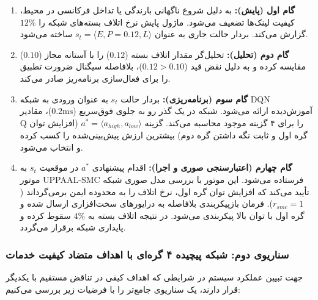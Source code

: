 \documentclass[oneside,openany,phd]{TMU-Thesis}
\begin{document}
\begin{enumerate}

\item \textbf{گام اول (پایش):} به دلیل شروع ناگهانی بارندگی یا تداخل فرکانسی در محیط، کیفیت لینک‌ها تضعیف می‌شود. ماژول پایش نرخ اتلاف بسته‌های شبکه را $12\%$ گزارش می‌کند. بردار حالت جاری به عنوان $s_t = \langle E, P=0.12, L \rangle$ ساخته می‌شود.

\item \textbf{گام دوم (تحلیل):} تحلیل‌گر مقدار اتلاف بسته ($0.12$) را با آستانه مجاز ($0.10$) مقایسه کرده و به دلیل نقض قید ($0.12 > 0.10$)، بلافاصله سیگنال ضرورت تطبیق را برای فعال‌سازی برنامه‌ریز صادر می‌کند.

\item \textbf{گام سوم (برنامه‌ریزی):} بردار حالت $s_t$ به عنوان ورودی به شبکه DQN آموزش‌دیده ارائه می‌شود. شبکه در یک گذر رو به جلوی فوق‌سریع ($0.2\text{ms}$)، مقادیر Q را برای ۴ گزینه موجود محاسبه می‌کند. گزینه $a^* = \langle a_{high}, a_{low} \rangle$ (افزایش توان گره اول و ثابت نگه داشتن گره دوم) بیشترین ارزش پیش‌بینی‌شده را کسب کرده و انتخاب می‌شود.

\item \textbf{گام چهارم (اعتبارسنجی صوری و اجرا):} اقدام پیشنهادی $a^*$ در موقعیت $s_t$ به موتور UPPAAL-SMC فرستاده می‌شود. این موتور با بررسی مدل صوری شبکه تأیید می‌کند که افزایش توان گره اول، نرخ اتلاف را به محدوده ایمن برمی‌گرداند ($r_{smc} = 1$). فرمان بازپیکربندی بلافاصله به درایورهای سخت‌افزاری ارسال شده و گره اول با توان بالا پیکربندی می‌شود. در نتیجه اتلاف بسته به $4\%$ سقوط کرده و پایداری شبکه برقرار می‌گردد.

\end{enumerate}



\subsubsection{سناریوی دوم: شبکه پیچیده ۴ گره‌ای با اهداف متضاد کیفیت خدمات}

جهت تبیین عملکرد سیستم در شرایطی که اهداف کیفی در تناقض مستقیم با یکدیگر قرار دارند، یک سناریوی جامع‌تر را با فرضیات زیر بررسی می‌کنیم:
\end{document}
